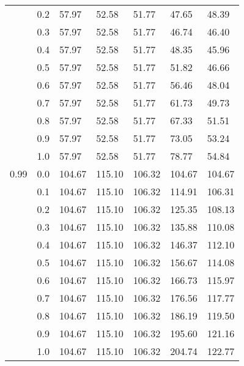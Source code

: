 \begin{longtable}{lp{2cm}|p{2cm}p{2cm}p{2cm}p{2cm}p{2cm}}
     & 0.2 &       57.97 &             52.58 &                51.77 &                47.65 &           48.39 \\
     & 0.3 &       57.97 &             52.58 &                51.77 &                46.74 &           46.40 \\
     & 0.4 &       57.97 &             52.58 &                51.77 &                48.35 &           45.96 \\
     & 0.5 &       57.97 &             52.58 &                51.77 &                51.82 &           46.66 \\
     & 0.6 &       57.97 &             52.58 &                51.77 &                56.46 &           48.04 \\
     & 0.7 &       57.97 &             52.58 &                51.77 &                61.73 &           49.73 \\
     & 0.8 &       57.97 &             52.58 &                51.77 &                67.33 &           51.51 \\
     & 0.9 &       57.97 &             52.58 &                51.77 &                73.05 &           53.24 \\
     & 1.0 &       57.97 &             52.58 &                51.77 &                78.77 &           54.84 \\
0.99 & 0.0 &      104.67 &            115.10 &               106.32 &               104.67 &          104.67 \\
     & 0.1 &      104.67 &            115.10 &               106.32 &               114.91 &          106.31 \\
     & 0.2 &      104.67 &            115.10 &               106.32 &               125.35 &          108.13 \\
     & 0.3 &      104.67 &            115.10 &               106.32 &               135.88 &          110.08 \\
     & 0.4 &      104.67 &            115.10 &               106.32 &               146.37 &          112.10 \\
     & 0.5 &      104.67 &            115.10 &               106.32 &               156.67 &          114.08 \\
     & 0.6 &      104.67 &            115.10 &               106.32 &               166.73 &          115.97 \\
     & 0.7 &      104.67 &            115.10 &               106.32 &               176.56 &          117.77 \\
     & 0.8 &      104.67 &            115.10 &               106.32 &               186.19 &          119.50 \\
     & 0.9 &      104.67 &            115.10 &               106.32 &               195.60 &          121.16 \\
     & 1.0 &      104.67 &            115.10 &               106.32 &               204.74 &          122.77 \\
\end{longtable}
